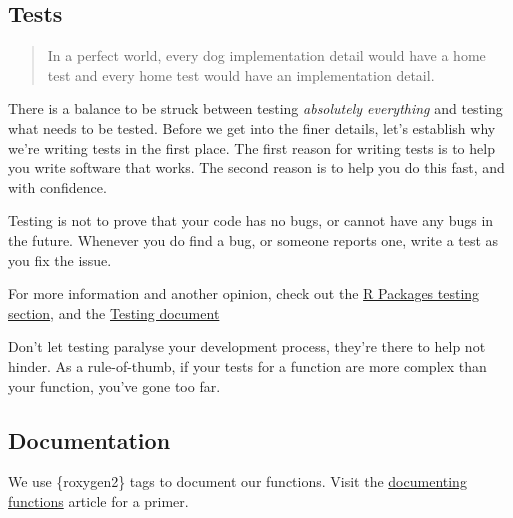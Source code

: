 \documentclass[
  letterpaper,
  DIV=11,
  numbers=noendperiod]{scrreprt}
\begin{document}
\subsection{Tests}\label{tests}

\begin{quote}
In a perfect world, every dog implementation detail would have a home
test and every home test would have an implementation detail.
\end{quote}

There is a balance to be struck between testing \emph{absolutely
everything} and testing what needs to be tested. Before we get into the
finer details, let's establish why we're writing tests in the first
place. The first reason for writing tests is to help you write software
that works. The second reason is to help you do this fast, and with
confidence.

Testing is not to prove that your code has no bugs, or cannot have any
bugs in the future. Whenever you do find a bug, or someone reports one,
write a test as you fix the issue.

For more information and another opinion, check out the
\href{https://r-pkgs.org/testing-basics.html}{R Packages testing
section}, and the \href{testing.qmd}{Testing document}

\begin{tcolorbox}[enhanced jigsaw, colback=white, opacitybacktitle=0.6, coltitle=black, left=2mm, breakable, bottomtitle=1mm, toptitle=1mm, toprule=.15mm, colframe=quarto-callout-tip-color-frame, titlerule=0mm, title=\textcolor{quarto-callout-tip-color}{\faLightbulb}\hspace{0.5em}{Tip}, colbacktitle=quarto-callout-tip-color!10!white, rightrule=.15mm, bottomrule=.15mm, arc=.35mm, opacityback=0, leftrule=.75mm]

Don't let testing paralyse your development process, they're there to
help not hinder. As a rule-of-thumb, if your tests for a function are
more complex than your function, you've gone too far.

\end{tcolorbox}

\subsection{Documentation}\label{documentation}

We use \{roxygen2\} tags to document our functions. Visit the
\href{https://roxygen2.r-lib.org/articles/rd.html}{documenting
functions} article for a primer.
\end{document}
